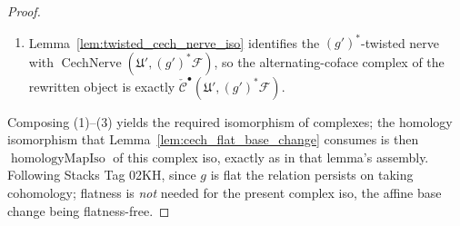 \begin{proof}
\begin{enumerate}
      \(\operatorname{alternatingCofaceMapComplex}\) via \(\operatorname{Functor.mapIso}\)
      makes compatibility with the {\v C}ech differentials automatic --- no per-degree
      naturality square need be checked by hand.
    \item Lemma~\ref{lem:twisted_cech_nerve_iso} identifies the \((g')^*\)-twisted nerve
      with \(\operatorname{CechNerve}(\mathfrak{U}', (g')^*\mathcal{F})\), so the
      alternating-coface complex of the rewritten object is exactly
      \(\check{\mathcal{C}}^\bullet(\mathfrak{U}', (g')^*\mathcal{F})\).
  \end{enumerate}
  Composing (1)--(3) yields the required isomorphism of complexes; the homology
  isomorphism that Lemma~\ref{lem:cech_flat_base_change} consumes is then
  \(\operatorname{homologyMapIso}\) of this complex iso, exactly as in that lemma's
  assembly. Following Stacks Tag 02KH, since \(g\) is flat the relation persists on
  taking cohomology; flatness is \emph{not} needed for the present complex iso, the
  affine base change being flatness-free.
\end{proof}

